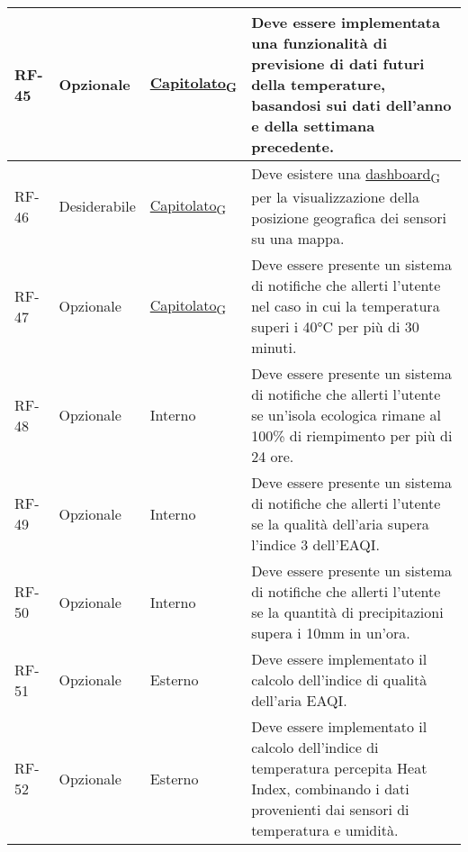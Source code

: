 \begin{longtable}{|>{\centering\arraybackslash}m{}|>{\centering\arraybackslash}m{}|>{\centering\arraybackslash}m{}|>{\centering\arraybackslash}m{}|}
	\\\hline
	RF-45           & Opzionale           & \href{https://7last.github.io/docs/pb/documentazione-interna/glossario\#capitolato}{Capitolato\textsubscript{G}} & Deve essere implementata una funzionalità di previsione di dati futuri della temperature, basandosi sui dati dell'anno e della settimana precedente.
	\\\hline
	RF-46           & Desiderabile        & \href{https://7last.github.io/docs/pb/documentazione-interna/glossario\#capitolato}{Capitolato\textsubscript{G}} & Deve esistere una \href{https://7last.github.io/docs/pb/documentazione-interna/glossario\#dashboard}{dashboard\textsubscript{G}} per la visualizzazione della posizione geografica dei sensori su una mappa.
	\\\hline
	RF-47           & Opzionale           & \href{https://7last.github.io/docs/pb/documentazione-interna/glossario\#capitolato}{Capitolato\textsubscript{G}} & Deve essere presente un sistema di notifiche che allerti l'utente nel caso in cui la temperatura superi i 40°C per più di 30 minuti.
	\\\hline
	RF-48           & Opzionale           & Interno                                                                                                           & Deve essere presente un sistema di notifiche che allerti l'utente se un'isola ecologica rimane al 100\% di riempimento per più di 24 ore.
	\\\hline
	RF-49           & Opzionale           & Interno                                                                                                           & Deve essere presente un sistema di notifiche che allerti l'utente se la qualità dell'aria supera l'indice 3 dell'EAQI.
	\\\hline
	RF-50           & Opzionale           & Interno                                                                                                           & Deve essere presente un sistema di notifiche che allerti l'utente se la quantità di precipitazioni supera i 10mm in un'ora.
	\\\hline
	RF-51           & Opzionale           & Esterno                                                                                                           & Deve essere implementato il calcolo dell'indice di qualità dell'aria EAQI.
	\\\hline
	RF-52           & Opzionale           & Esterno                                                                                                           & Deve essere implementato il calcolo dell'indice di temperatura percepita Heat Index, combinando i dati provenienti dai sensori di temperatura e umidità.

\end{longtable}
